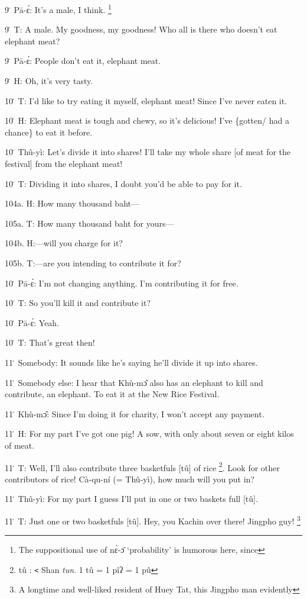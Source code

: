 9\. Pā-ɛ́: It's a male, I think. \footnote{The suppositional use of nɛ̀-ɔ̄ `probability' is humorous here, since}

9\. T: A male.  My goodness, my goodness!  Who all is there who doesn't eat elephant
meat?

9\. Pā-ɛ́: People don't eat it, elephant meat.

9\. H: Oh, it's very tasty.

10\. T: I'd like to try eating it myself, elephant meat!  Since I've never eaten
it.

10\. H: Elephant meat is tough and chewy, so it's delicious!  I've \{gotten/ had
a chance\} to eat it before.

10\. Thû-yì: Let's divide it into shares!  I'll take my whole share [of meat
for the festival] from the elephant meat!

10\. T: Dividing it into shares, I doubt you'd be able to pay for it.

104a. H: How many thousand baht---

105a. T: How many thousand baht for yours---

104b. H:---will you charge for it?

105b. T:---are you intending to contribute it for?

10\. Pā-ɛ́: I'm not changing anything.  I'm contributing it for free.

10\. T: So you'll kill it and contribute it?

10\. Pā-ɛ́: Yeah.

10\. T: That's great then!

11\. Somebody: It sounds like he's saying he'll divide it up into shares.

11\. Somebody else: I hear that Khù-mɔ̂ also has an elephant to kill and contribute,
an elephant.  To eat it at the New Rice Festival.

11\. Khù-mɔ̂: Since I'm doing it for charity, I won't accept any payment.

11\. H: For my part I've got one pig!  A sow, with only about seven or eight kilos
of meat.

11\. T: Well, I'll also contribute three basketfuls [tû] of rice \footnote{tû : \texttt{<} Shan \textit{tun}.  1 tû = 1 pîʔ = 1 pû}.  Look for
other contributors of rice!  Cà-qu-ní (= Thû-yì), how much will you put in?

11\. Thû-yì: For my part I guess I'll put in one or two baskets full [tû].

11\. T: Just one or two basketfuls [tû].  Hey, you Kachin over there!  Jingpho
guy! \footnote{A longtime and well-liked resident of Huey Tat, this Jingpho man evidently}

